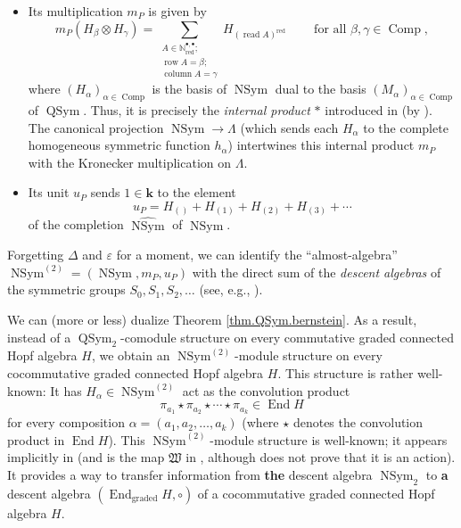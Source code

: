 \documentclass
[numbers=enddot,12pt,final,onecolumn,notitlepage,abstracton]{scrartcl}%
\theoremstyle{definition}
\let\sumnonlimits\sum
\renewcommand{\sum}{\sumnonlimits\limits}
\begin{document}
\begin{itemize}
\item Its multiplication $m_{P}$ is given by%
\[
m_{P}\left(  H_{\beta}\otimes H_{\gamma}\right)  =\sum_{\substack{A\in
\mathbb{N}_{\operatorname*{red}}^{\bullet,\bullet};\\\operatorname*{row}%
A=\beta;\\\operatorname*{column}A=\gamma}}H_{\left(  \operatorname*{read}%
A\right)  ^{\operatorname*{red}}}\ \ \ \ \ \ \ \ \ \ \text{for all }%
\beta,\gamma\in\operatorname*{Comp},
\]
where $\left(  H_{\alpha}\right)  _{\alpha\in\operatorname*{Comp}}$ is the
basis of $\operatorname*{NSym}$ dual to the basis $\left(  M_{\alpha}\right)
_{\alpha\in\operatorname*{Comp}}$ of $\operatorname*{QSym}$. Thus, it is
precisely the \emph{internal product} $\ast$ introduced in \cite[Section
5.1]{NCSF1} (by \cite[Proposition 5.1]{NCSF1}). The canonical projection
$\operatorname*{NSym}\rightarrow\Lambda$ (which sends each $H_{\alpha}$ to the
complete homogeneous symmetric function $h_{\alpha}$) intertwines this
internal product $m_{P}$ with the Kronecker multiplication on $\Lambda$.

\item Its unit $u_{P}$ sends $1\in\mathbf{k}$ to the element%
\[
u_{P}=H_{\left(  {}\right)  }+H_{\left(  1\right)  }+H_{\left(  2\right)
}+H_{\left(  3\right)  }+\cdots
\]
of the completion $\widehat{\operatorname*{NSym}}$ of $\operatorname*{NSym}$.
\end{itemize}

Forgetting $\Delta$ and $\varepsilon$ for a moment, we can identify the
\textquotedblleft almost-algebra\textquotedblright\ $\operatorname*{NSym}%
\nolimits^{\left(  2\right)  }=\left(  \operatorname*{NSym},m_{P}%
,u_{P}\right)  $ with the direct sum of the \emph{descent algebras} of the
symmetric groups $S_{0},S_{1},S_{2},\ldots$ (see, e.g., \cite[Section
5.1]{NCSF1}).

We can (more or less) dualize Theorem \ref{thm.QSym.bernstein}. As a result,
instead of a $\operatorname*{QSym}\nolimits_{2}$-comodule structure on every
commutative graded connected Hopf algebra $H$, we obtain an
$\operatorname*{NSym}\nolimits^{\left(  2\right)  }$-module structure on every
cocommutative graded connected Hopf algebra $H$. This structure is rather
well-known: It has $H_{\alpha}\in\operatorname*{NSym}\nolimits^{\left(
2\right)  }$ act as the convolution product
\[
\pi_{a_{1}}\star\pi_{a_{2}}\star\cdots\star\pi_{a_{k}}\in\operatorname*{End}H
\]
for every composition $\alpha=\left(  a_{1},a_{2},\ldots,a_{k}\right)  $
(where $\star$ denotes the convolution product in $\operatorname*{End}H$).
This $\operatorname*{NSym}\nolimits^{\left(  2\right)  }$-module structure is
well-known; it appears implicitly in \cite[Th\'{e}or\`{e}me II.7]{Patras94}
(and is the map $\mathfrak{W}$ in \cite[Hint to Exercise 5.4.6]{Reiner},
although \cite{Reiner} does not prove that it is an action). It provides a way
to transfer information from \textbf{the} descent algebra
$\operatorname*{NSym}\nolimits_{2}$ to \textbf{a} descent algebra $\left(
\operatorname*{End}\nolimits_{\text{graded}}H,\circ\right)  $ of a
cocommutative graded connected Hopf algebra $H$.
\end{document}
